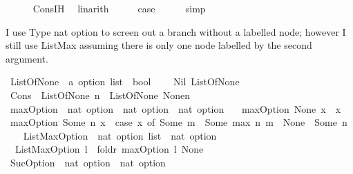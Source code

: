 \begin{isabellebody}
\ \ \ \ \isamarkupfalse%
\ Cons{\isachardot}IH\ \isamarkupfalse%
\ linarith\isanewline
\ \ \isamarkupfalse%
\ \isamarkupfalse%
\ {\isacharquery}case\isanewline
\ \ \ \ \isamarkupfalse%
\ simp\ \isanewline
{}\isamarkupfalse%
%
\endisatagproof
{\isafoldproof}%
%
\isadelimproof
%
\endisadelimproof
%
\begin{isamarkuptext}%
I use Type nat option to screen out a branch without a labelled node; however I still use ListMax assuming there
is only one node labelled by the second argument.%
\end{isamarkuptext}\isamarkuptrue%
\isamarkupfalse%
\ ListOfNone\ {\isacharcolon}{\isacharcolon}\ {\isachardoublequoteopen}{\isacharparenleft}{\isacharprime}a\ option{\isacharparenright}\ list\ {\isasymRightarrow}\ bool{\isachardoublequoteclose}\ \ \isanewline
\ \ Nil{\isacharcolon}\ {\isachardoublequoteopen}ListOfNone\ {\isacharbrackleft}{\isacharbrackright}{\isachardoublequoteclose}\isanewline
{\isacharbar}\ Cons\ {\isacharcolon}\ {\isachardoublequoteopen}ListOfNone\ n\ {\isasymLongrightarrow}\ ListOfNone\ {\isacharparenleft}None{\isacharhash}n{\isacharparenright}{\isachardoublequoteclose}\isanewline
\isanewline
{}\isamarkupfalse%
\ maxOption\ {\isacharcolon}{\isacharcolon}\ {\isachardoublequoteopen}nat\ option\ {\isasymRightarrow}\ nat\ option\ {\isasymRightarrow}\ nat\ option{\isachardoublequoteclose}\ \isanewline
\ \ {\isachardoublequoteopen}maxOption\ None\ x\ {\isacharequal}\ x{\isachardoublequoteclose}\isanewline
{\isacharbar}\ {\isachardoublequoteopen}maxOption\ {\isacharparenleft}Some\ n{\isacharparenright}\ x\ {\isacharequal}\ {\isacharparenleft}case\ x\ of\ Some\ m\ {\isasymRightarrow}\ Some\ {\isacharparenleft}max\ n\ m{\isacharparenright}\ {\isacharbar}\ None\ {\isasymRightarrow}\ Some\ n{\isacharparenright}{\isachardoublequoteclose}\ \isanewline
\ \ \isanewline
{}\isamarkupfalse%
\ ListMaxOption\ {\isacharcolon}{\isacharcolon}\ {\isachardoublequoteopen}{\isacharparenleft}nat\ option{\isacharparenright}\ list\ {\isasymRightarrow}\ nat\ option{\isachardoublequoteclose}\ \isanewline
\ \ {\isachardoublequoteopen}ListMaxOption\ l\ {\isacharequal}\ foldr\ maxOption\ l\ None{\isachardoublequoteclose}\isanewline
\isanewline
{}\isamarkupfalse%
\ SucOption\ {\isacharcolon}{\isacharcolon}\ {\isachardoublequoteopen}nat\ option\ {\isasymRightarrow}\ nat\ option{\isachardoublequoteclose}\ \isanewline

\end{isabellebody}
